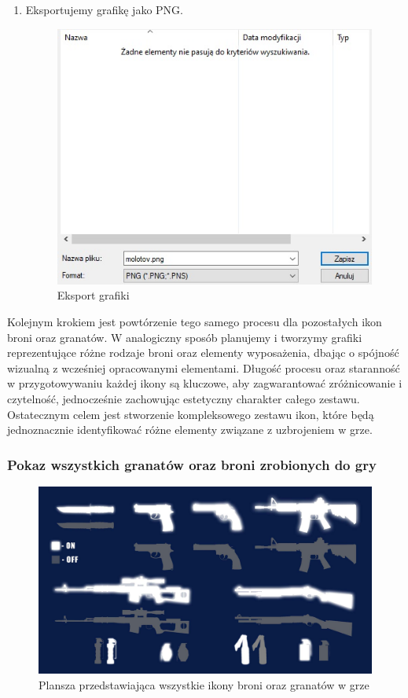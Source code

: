 \begin{enumerate}
  \item Eksportujemy grafikę jako PNG.
\begin{figure}[h]
    \centering
    \includegraphics[scale=0.7]{Images/Saving.jpg}
    \caption{Eksport grafiki}
\end{figure}
\FloatBarrier
\end{enumerate}

Kolejnym krokiem jest powtórzenie tego samego procesu dla pozostałych ikon broni oraz granatów. W analogiczny sposób planujemy i tworzymy grafiki reprezentujące różne rodzaje broni oraz elementy wyposażenia, dbając o spójność wizualną z wcześniej opracowanymi elementami. Długość procesu oraz staranność w przygotowywaniu każdej ikony są kluczowe, aby zagwarantować zróżnicowanie i czytelność, jednocześnie zachowując estetyczny charakter całego zestawu. Ostatecznym celem jest stworzenie kompleksowego zestawu ikon, które będą jednoznacznie identyfikować różne elementy związane z uzbrojeniem w grze.

\subsubsection{Pokaz wszystkich granatów oraz broni zrobionych do gry}

\begin{figure}[h]
    \centering
    \includegraphics[scale=0.2]{Images/Pokazanie ikon broni.jpg}
    \caption{Plansza przedstawiająca wszystkie ikony broni oraz granatów w grze}
\end{figure}
\FloatBarrier

